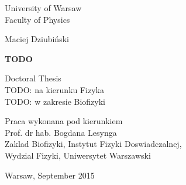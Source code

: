 \vspace{1cm}		%
\pagestyle{empty}	%

\begin{center}
\begin{huge}
	\textsf{University of Warsaw}\\
	\vspace{0.4cm}		%
	\textsf{Faculty of Physics}
\end{huge}

\vspace{2cm}		%

\begin{Large}
	Maciej Dziubiński\\
\end{Large}

\vspace{1.5cm}

\begin{huge}
	\textbf{\textsf{TODO}}
\end{huge}

\vspace{3cm}

\begin{large}
	Doctoral Thesis\\
	TODO: na kierunku Fizyka\\
	TODO: w zakresie Biofizyki\\
\end{large}

\end{center}

\vspace{2cm}		%

\begin{flushright}
\begin{large}
	Praca wykonana pod kierunkiem\\
	Prof. dr hab. Bogdana Lesynga\\
	Zaklad Biofizyki, Instytut Fizyki Doswiadczalnej,\\
	Wydzial Fizyki, Uniwersytet Warszawski\\
\end{large}
\end{flushright}

\vspace{2.0cm}

\begin{center}
	Warsaw, September 2015
\end{center}


